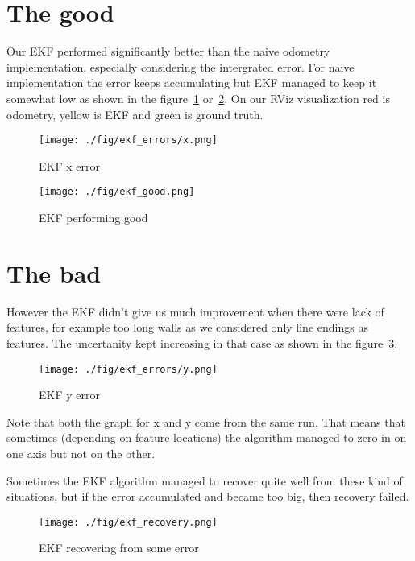 \documentclass[12pt, a4paper, onecolumn]{article}
\begin{document}
\maketitle

\section{The good}
Our EKF performed significantly better than the naive odometry implementation, especially considering the intergrated error.
For naive implementation the error keeps accumulating but EKF managed to keep it somewhat low as shown in the figure~\ref{fig:err_x} or~\ref{fig:ekf_good}.
On our RViz visualization red is odometry, yellow is EKF and green is ground truth.

\begin{figure}[h!]
  \begin{center}
    \texttt{[image: ./fig/ekf\_errors/x.png]}
  \end{center}
  \caption{EKF x error}
  \label{fig:err_x}
\end{figure}

\begin{figure}[h!]
  \begin{center}
    \texttt{[image: ./fig/ekf\_good.png]}
  \end{center}
  \caption{EKF performing good}
  \label{fig:ekf_good}
\end{figure}


\newpage
\section{The bad}
However the EKF didn't give us much improvement when there were lack of features, for example too long walls as we considered only line endings as features.
The uncertanity kept increasing in that case as shown in the figure~\ref{fig:err_y}.
\begin{figure}[h!]
  \begin{center}
    \texttt{[image: ./fig/ekf\_errors/y.png]}
  \end{center}
  \caption{EKF y error}
  \label{fig:err_y}
\end{figure}
Note that both the graph for x and y come from the same run. That means that sometimes (depending on feature locations) the algorithm managed
to zero in on one axis but not on the other.

Sometimes the EKF algorithm managed to recover quite well from these kind of situations, but if the error accumulated and became too big, then recovery failed.
\begin{figure}[h!]
  \begin{center}
    \texttt{[image: ./fig/ekf\_recovery.png]}
  \end{center}
  \caption{EKF recovering from some error}
  \label{fig:ekf_recovery}
\end{figure}
\end{document}

